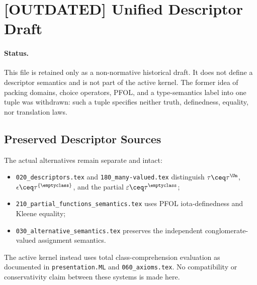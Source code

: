 \def\topic{[OUTDATED] Unified Descriptors}

\section{[OUTDATED] Unified Descriptor Draft}

\paragraph{Status.}
This file is retained only as a non-normative historical draft. It does not
define a descriptor semantics and is not part of the active kernel. The former
idea of packing domains, choice operators, PFOL, and a type-semantics label
into one tuple was withdrawn: such a tuple specifies neither truth,
definedness, equality, nor translation laws.

\subsection{Preserved Descriptor Sources}
The actual alternatives remain separate and intact:
\begin{itemize}
\item \texttt{020\_descriptors.tex} and \texttt{180\_many-valued.tex}
  distinguish $\tau\ceq\tau^{\Un}$,
  $\epsilon\ceq\tau^{\{\emptyclass\}}$, and the partial
  $\varepsilon\ceq\tau^{\emptyclass}$;
\item \texttt{210\_partial\_functions\_semantics.tex} uses PFOL
  iota-definedness and Kleene equality;
\item \texttt{030\_alternative\_semantics.tex} preserves the independent
  conglomerate-valued assignment semantics.
\end{itemize}

The active kernel instead uses total class-comprehension evaluation as
documented in \texttt{presentation.ML} and \texttt{060\_axioms.tex}. No
compatibility or conservativity claim between these systems is made here.


